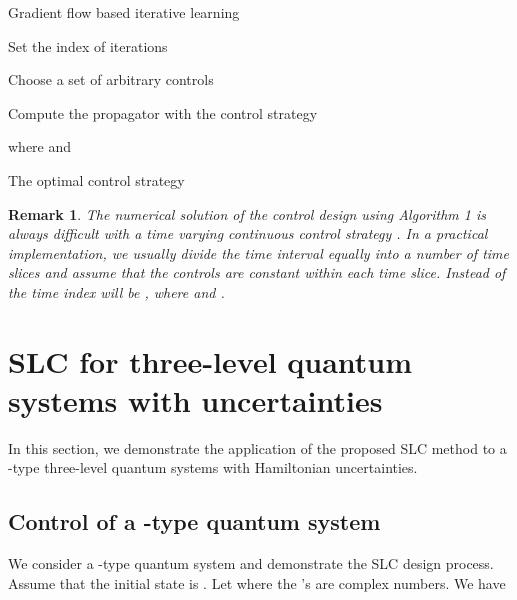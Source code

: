 \documentclass[letterpaper, 10 pt, conference]{ieeeconf}
\newtheorem{remark}{\indent Remark}
\begin{document}
\begin{algorithm}
\caption{Gradient flow based iterative learning}
\label{ModifiedGradientFlow}

\begin{algorithmic}[1]

\State Set the index of iterations 

\State Choose a set of arbitrary controls 



\State Compute the propagator  with the control
strategy 


\Until {\ }


\State
 where  and 

\State 

\Until {\ }

\State 


\State The optimal control strategy


\end{algorithmic}
\end{algorithm}

\begin{remark}
The numerical solution of the control design using \emph{Algorithm
1} is always difficult with a time varying continuous control
strategy . In a practical implementation, we usually
divide the time interval  equally into a number of time
slices  and assume that the controls are constant
within each time slice. Instead of  the time
index will be , where  and
.
\end{remark}

\section{SLC for three-level quantum systems with uncertainties}\label{Sec4}
In this section, we demonstrate the application of the
proposed SLC method to a -type three-level quantum systems with Hamiltonian uncertainties.

\subsection{Control of a -type quantum system}
We consider a -type quantum system and
demonstrate the SLC design process. Assume that the initial state is
.
Let  where the 's are complex numbers. We have
\end{document}
